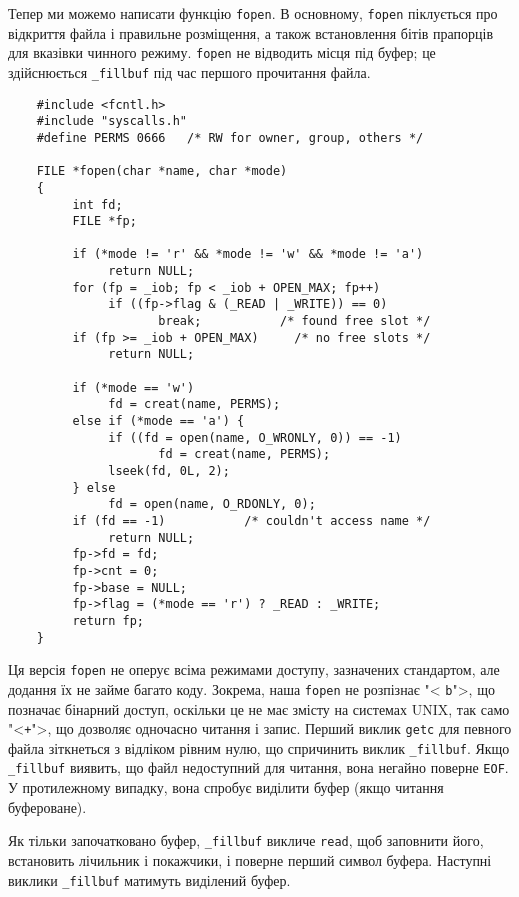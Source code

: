 \documentclass[a4paper,12pt]{book}
\begin{document}
  Тепер ми можемо написати функцію \texttt{fopen}. В основному, \texttt{fopen} піклується
  про відкриття файла і правильне розміщення, а також встановлення бітів прапорців для
  вказівки чинного режиму. \texttt{fopen} не відводить місця під буфер; це здійснюється
  \texttt{\_fillbuf} під час першого прочитання файла.

  \begin{verbatim}
    #include <fcntl.h>
    #include "syscalls.h"
    #define PERMS 0666   /* RW for owner, group, others */

    FILE *fopen(char *name, char *mode)
    {
         int fd;
         FILE *fp;

         if (*mode != 'r' && *mode != 'w' && *mode != 'a')
              return NULL;
         for (fp = _iob; fp < _iob + OPEN_MAX; fp++)
              if ((fp->flag & (_READ | _WRITE)) == 0)
                     break;           /* found free slot */
         if (fp >= _iob + OPEN_MAX)     /* no free slots */
              return NULL;

         if (*mode == 'w')
              fd = creat(name, PERMS);
         else if (*mode == 'a') {
              if ((fd = open(name, O_WRONLY, 0)) == -1)
                     fd = creat(name, PERMS);
              lseek(fd, 0L, 2);
         } else
              fd = open(name, O_RDONLY, 0);
         if (fd == -1)           /* couldn't access name */
              return NULL;
         fp->fd = fd;
         fp->cnt = 0;
         fp->base = NULL;
         fp->flag = (*mode == 'r') ? _READ : _WRITE;
         return fp;
    }
  \end{verbatim}

  Ця версія \texttt{fopen} не оперує всіма режимами доступу, зазначених стандартом, але
  додання їх не займе багато коду. Зокрема, наша \texttt{fopen} не розпізнає "<
  \texttt{b}">, що позначає бінарний доступ, оскільки це не має змісту на системах
  UNIX, так само "<\texttt{+}">, що дозволяє одночасно читання і запис. Перший
  виклик \texttt{getc} для певного файла зіткнеться з відліком рівним нулю, що спричинить
  виклик \texttt{\_fillbuf}. Якщо \texttt{\_fillbuf} виявить, що файл недоступний для
  читання, вона негайно поверне \texttt{EOF}. У протилежному випадку, вона спробує
  виділити буфер (якщо читання буфероване).

  Як тільки започатковано буфер, \texttt{\_fillbuf} викличе \texttt{read}, щоб заповнити
  його, встановить лічильник і покажчики, і поверне перший символ буфера. Наступні виклики
  \texttt{\_fillbuf} матимуть виділений буфер.
\end{document}
